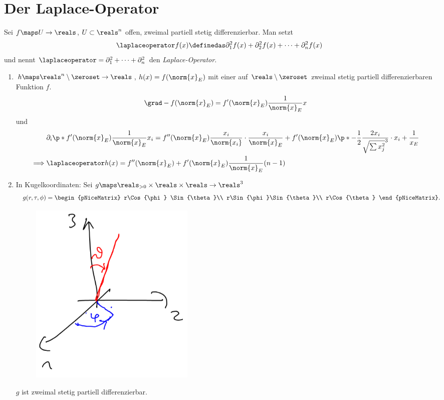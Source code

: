 \section{Der Laplace-Operator}
Sei \( f\maps U\to \reals \), \( U\subset \reals^n \) offen, zweimal partiell stetig differenzierbar. Man setzt
\begin{equation*}
  \laplaceoperator f(x)\definedas \partial_1^2 f(x)+\partial_2^2 f(x)+\dotsb+\partial_n^2 f(x)
\end{equation*}
und nennt \( \laplaceoperator=\partial_1^2+\dotsb+\partial_n^2 \) den \emph{Laplace-Operator}.
\begin{beispiele*}
  \begin{enumerate}
    \item \( h\maps \reals^n\setminus\zeroset\to \reals \), \( h(x)=f(\norm{x}_E) \) mit einer auf \( \reals\setminus \zeroset \) zweimal stetig partiell differenzierbaren Funktion \( f \).
    \begin{equation*}
      \grad-{f(\norm{x}_E)}=f'(\norm{x}_E)\frac{1}{\norm{x}_E}x
    \end{equation*}
    und
    \begin{align*}
      &\partial_i\p*{f'(\norm{x}_E)\frac{1}{\norm{x}_E}x_i }=f''(\norm{x}_E)\frac{x_i}{\norm{x_i}}\cdot\frac{x_i}{\norm{x}_E}+f'(\norm{x}_E)\p*{ -\frac{1}{2}\frac{2x_i}{\sqrt{\sum x_j^2}^3}\cdot x_i +\frac{1}{x_E} }\\
      \implies &\laplaceoperator h(x)=f''(\norm{x}_E)+f'(\norm{x}_E)\frac{1}{\norm{x}_E}(n-1)
    \end{align*}
    \item In Kugelkoordinaten: Sei \( g\maps \reals_{>0}\times \reals\times\reals\to \reals^3 \)
    \begin{equation*}
      g(r,\tau,\phi)=\begin{pNiceMatrix} r\Cos{\phi} \Sin{\theta}\\ r\Sin{\phi}\Sin{\theta}\\ r\Cos{\theta} \end{pNiceMatrix}.
    \end{equation*}
    \begin{figure}[H]
      \centering
      \includegraphics[width=0.5\linewidth]{figures/kugelkoordinaten}
      \label{fig:kugelkoordinaten}
    \end{figure}
    \( g \) ist zweimal stetig partiell differenzierbar.


\end{enumerate}
\end{beispiele*}
